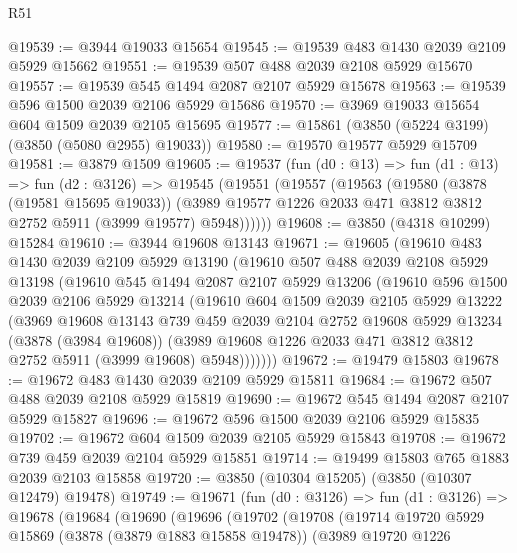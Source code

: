 \begin{lexlean}{R51}
\begin{coremodule}
@19539 := @3944 @19033 @15654
@19545 := @19539 @483 @1430 @2039 @2109 @5929 @15662
@19551 := @19539 @507 @488 @2039 @2108 @5929 @15670
@19557 := @19539 @545 @1494 @2087 @2107 @5929 @15678
@19563 := @19539 @596 @1500 @2039 @2106 @5929 @15686
@19570 := @3969 @19033 @15654 @604 @1509 @2039 @2105 @15695
@19577 := @15861 (@3850 (@5224 @3199) (@3850 (@5080 @2955) @19033))
@19580 := @19570 @19577 @5929 @15709
@19581 := @3879 @1509
@19605 := @19537
    (fun (d0 : @13) =>
    fun (d1 : @13) =>
    fun (d2 : @3126) =>
    @19545
      (@19551
        (@19557
          (@19563
            (@19580
              (@3878 (@19581 @15695 @19033))
              (@3989 @19577 @1226 @2033 @471 @3812 @3812 @2752 @5911 (@3999 @19577) @5948))))))
@19608 := @3850 (@4318 @10299) @15284
@19610 := @3944 @19608 @13143
@19671 := @19605
    (@19610
      @483
      @1430
      @2039
      @2109
      @5929
      @13190
      (@19610
        @507
        @488
        @2039
        @2108
        @5929
        @13198
        (@19610
          @545
          @1494
          @2087
          @2107
          @5929
          @13206
          (@19610
            @596
            @1500
            @2039
            @2106
            @5929
            @13214
            (@19610
              @604
              @1509
              @2039
              @2105
              @5929
              @13222
              (@3969
                @19608
                @13143
                @739
                @459
                @2039
                @2104
                @2752
                @19608
                @5929
                @13234
                (@3878 (@3984 @19608))
                (@3989 @19608 @1226 @2033 @471 @3812 @3812 @2752 @5911 (@3999 @19608) @5948)))))))
@19672 := @19479 @15803
@19678 := @19672 @483 @1430 @2039 @2109 @5929 @15811
@19684 := @19672 @507 @488 @2039 @2108 @5929 @15819
@19690 := @19672 @545 @1494 @2087 @2107 @5929 @15827
@19696 := @19672 @596 @1500 @2039 @2106 @5929 @15835
@19702 := @19672 @604 @1509 @2039 @2105 @5929 @15843
@19708 := @19672 @739 @459 @2039 @2104 @5929 @15851
@19714 := @19499 @15803 @765 @1883 @2039 @2103 @15858
@19720 := @3850 (@10304 @15205) (@3850 (@10307 @12479) @19478)
@19749 := @19671
    (fun (d0 : @3126) =>
    fun (d1 : @3126) =>
    @19678
      (@19684
        (@19690
          (@19696
            (@19702
              (@19708
                (@19714
                  @19720
                  @5929
                  @15869
                  (@3878 (@3879 @1883 @15858 @19478))
                  (@3989
                    @19720
                    @1226

\end{coremodule}
\end{lexlean}
